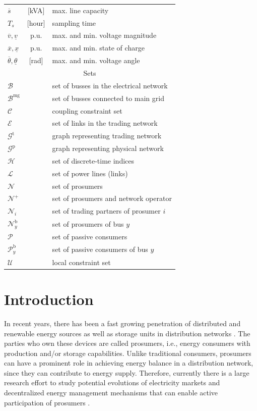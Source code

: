 \documentclass{IEEEtran}  %
\newcommand{\mc}{\mathcal}
\newcommand{\0}{\mathbf{0}}
\newcommand{\1}{\mathbf{1}}
\begin{document}
\begin{table}[!h]
\begin{tabular}{l c l}
		$\overline{s}$ & [kVA] & max. line capacity \\
		$T_s$ & [hour] & sampling time \\
		$\overline{v}, \underline{v}$ & p.u. & max. and min. voltage magnitude \\
		$\overline{x},\underline{x}$ &p.u. & max. and min. state of charge \\
		$\overline{\theta}, \underline{\theta}$ & [rad] & max. and min. voltage angle \\
		\hline
		\toprule
		\multicolumn{3}{c}{Sets}  \\
		\hline 
		$\mc B$ & & set of busses in the electrical network \\
		$\mc B^{\mathrm{mg}}$ & & set of busses connected to main grid\\
		$\mathcal{C}$ & & coupling constraint set \\
		$\mc E$ & & set of links in the trading network\\
		$\mathcal{G}^{\mathrm{t}}$ & & graph representing trading network \\
		$\mathcal{G}^{\mathrm{p}}$ & & graph representing physical network \\
		$\mc H$ & & set of discrete-time indices \\
		$\mc L$ & & set of power lines (links)\\
		$\mathcal{N}$ & & set of prosumers \\
		$\mathcal{N}^+$ & & set of prosumers and network operator\\
		$\mathcal{N}_i$ & & set of trading partners of prosumer $i$ \\
		$\mathcal{N}_y^{\mathrm{b}}$ & & set of prosumers of bus $y$ \\
		$\mc P$ & & set of passive consumers \\
		$\mc P_y^{\mathrm{b}}$& &set of passive consumers of bus $y$ \\
		$\mathcal{U}$ & & local constraint set \\ 
		\bottomrule
		
	\end{tabular}
	
\end{table}


	\section{Introduction}

In recent years, there has been a fast growing penetration of distributed and renewable energy sources as well as storage units in distribution networks \cite{parag2016}. The parties who own these devices are called prosumers, i.e., energy consumers with production and/or storage capabilities. Unlike traditional consumers, prosumers can have a prominent role in achieving energy balance in a distribution network, since they can contribute to energy supply.  Therefore, currently there is a large research effort to study potential evolutions of electricity markets and decentralized energy management mechanisms that can enable active participation of prosumers \cite{parag2016,tushar2018,liu2019,sousa2019}.
\end{document}
